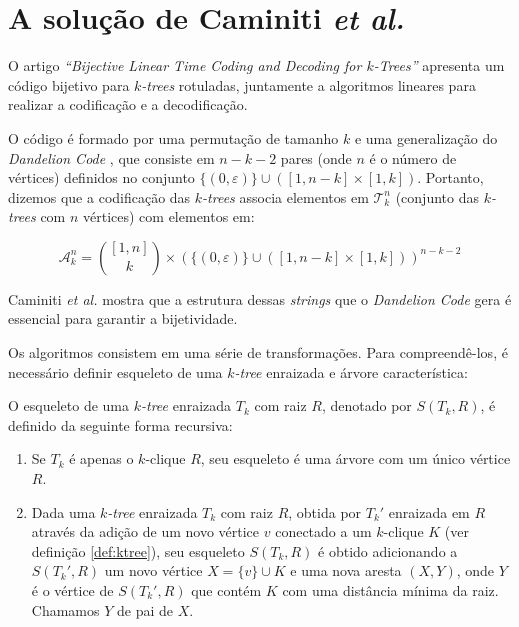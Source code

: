 \section{A solução de Caminiti \emph{et al.}}
\label{sec:caminiti}

O artigo \emph{``Bijective Linear Time Coding and Decoding for $k$-Trees''} \cite{caminiti} apresenta um código bijetivo para \emph{$k$-trees} rotuladas, juntamente a algoritmos lineares para realizar a codificação e a decodificação.

O código é formado por uma permutação de tamanho $k$ e uma generalização do \emph{Dandelion Code} \cite{egecioglu}, que consiste em $n-k-2$ pares (onde $n$ é o número de vértices) definidos no conjunto $\{ ( 0, \varepsilon ) \} \cup ([1,n-k] \times [1,k])$. Portanto, dizemos que a codificação das \emph{$k$-trees} associa elementos em $\mathcal{T}^n_k$ (conjunto das \emph{$k$-trees} com $n$ vértices) com elementos em:

$$
\mathcal{A}^n_k = { [1,n] \choose k } \times (\{ ( 0, \varepsilon ) \} \cup ([1,n-k] \times [1,k]))^{n-k-2}
$$

Caminiti \emph{et al.} \cite{caminiti} mostra que a estrutura dessas \emph{strings} que o \emph{Dandelion Code} gera é essencial para garantir a bijetividade.

\vspace{2em}

Os algoritmos consistem em uma série de transformações. Para compreendê-los, é necessário definir esqueleto de uma \emph{$k$-tree} enraizada e árvore característica:

\begin{definition}
  \label{def:skeleton}
  \cite{caminiti} O esqueleto de uma \emph{$k$-tree} enraizada $T_k$ com raiz $R$, denotado por $S(T_k, R)$, é definido da seguinte forma recursiva:

  \begin{enumerate}
    \item Se $T_k$ é apenas o $k$-clique $R$, seu esqueleto é uma árvore com um único vértice $R$.
    \item Dada uma \emph{$k$-tree} enraizada $T_k$ com raiz $R$, obtida por $T_k'$ enraizada em $R$ através da adição de um novo vértice $v$ conectado a um $k$-clique $K$ (ver definição \ref{def:ktree}), seu esqueleto $S(T_k, R)$ é obtido adicionando a $S(T_k', R)$ um novo vértice $X = \{v\} \cup K$ e uma nova aresta $(X, Y)$, onde $Y$ é o vértice de $S(T_k', R)$ que contém $K$ com uma distância mínima da raiz. Chamamos $Y$ de pai de $X$.
  \end{enumerate}
\end{definition}

